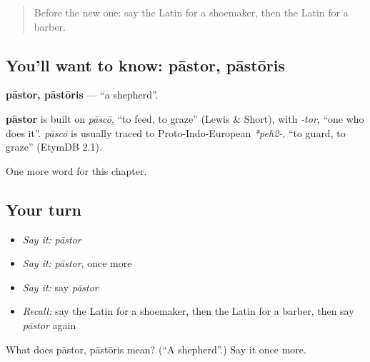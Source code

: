 \begin{quote}
Before the new one: say the Latin for a shoemaker, then the Latin for a barber.
\end{quote}

\subsection*{You'll want to know: pāstor, pāstōris}
\textbf{pāstor, pāstōris} — \textquotedblleft{}a shepherd\textquotedblright{}.

\begin{cousinweb}
\textbf{pāstor} is built on \emph{pāscō}, \textquotedblleft{}to feed, to graze\textquotedblright{} (Lewis \& Short), with \emph{-tor}, \textquotedblleft{}one who does it\textquotedblright{}. \emph{pāscō} is usually traced to Proto-Indo-European \emph{*peh2-}, \textquotedblleft{}to guard, to graze\textquotedblright{} (EtymDB 2.1).
\end{cousinweb}

\begin{grammarlens}[title={What you've built}]
One more word for this chapter.
\end{grammarlens}

\subsection*{Your turn}
\begin{itemize}
\raggedright
  \item \emph{Say it:} \emph{pāstor}
  \item \emph{Say it:} \emph{pāstor}, once more
  \item \emph{Say it:} say \emph{pāstor}
  \item \emph{Recall:} say the Latin for a shoemaker, then the Latin for a barber, then say \emph{pāstor} again
\end{itemize}

\begin{tcolorbox}[breakable,colback=teal!4,colframe=teal!35!black,title={Before you move on}]
What does pāstor, pāstōris mean? (\textquotedblleft{}A shepherd\textquotedblright{}.) Say it once more.
\end{tcolorbox}
